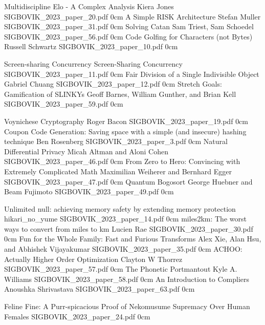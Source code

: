 \addpaper
	{Multidiscipline Elo - A Complex Analysis}
	{Kiera Jones}
	{}
	{SIGBOVIK_2023_paper_20.pdf}
	{0cm}
	{}
\addpaper
	{A Simple RISK Architecture}
	{Stefan Muller}
	{}
	{SIGBOVIK_2023_paper_31.pdf}
	{0cm}
	{}
\addpaper
	{Solving Catan}
	{Sam Triest, Sam Schoedel}
	{}
	{SIGBOVIK_2023_paper_56.pdf}
	{0cm}
	{}
\addpaper
	{Code Golfing for Characters (not Bytes)}
	{Russell Schwartz}
	{}
	{SIGBOVIK_2023_paper_10.pdf}
	{0cm}
	{}

\addpaper
	{Screen-sharing Concurrency}
	{Screen-Sharing Concurrency}
	{}
	{SIGBOVIK_2023_paper_11.pdf}
	{0cm}
	{}
\addpaper
	{Fair Division of a Single Indivisible Object}
	{Gabriel Chuang}
	{}
	{SIGBOVIK_2023_paper_12.pdf}
	{0cm}
	{}
\addpaper
	{Stretch Goals: Gamification of SLINKYs}
	{Geoff Barnes, William Gunther, and Brian Kell}
	{}
	{SIGBOVIK_2023_paper_59.pdf}
	{0cm}
	{}

\addpaper
	{Voynichese Cryptography}
	{Roger Bacon}
	{}
	{SIGBOVIK_2023_paper_19.pdf}
	{0cm}
	{}
\addpaper
	{Coupon Code Generation: Saving space with a simple (and insecure) hashing technique}
	{Ben Rosenberg}
	{}
	{SIGBOVIK_2023_paper_3.pdf}
	{0cm}
	{}
\addpaper
	{Natural Differential Privacy}
	{Micah Altman and Aloni Cohen}
	{}
	{SIGBOVIK_2023_paper_46.pdf}
	{0cm}
	{}
\addpaper
	{From Zero to Hero: Convincing with Extremely Complicated Math}
	{Maximilian Weiherer and Bernhard Egger}
	{}
	{SIGBOVIK_2023_paper_47.pdf}
	{0cm}
	{}
\addpaper
	{Quantum Bogosort}
	{George Huebner and Beam Fujimoto}
	{}
	{SIGBOVIK_2023_paper_49.pdf}
	{0cm}
	{}


\addpaper
	{Unlimited null: achieving memory safety by extending memory protection}
	{hikari\_no\_yume}
	{}
	{SIGBOVIK_2023_paper_14.pdf}
	{0cm}
	{}
\addpaper
	{miles2km: The worst ways to convert from miles to km}
	{Lucien Rae}
	{}
	{SIGBOVIK_2023_paper_30.pdf}
	{0cm}
	{}
\addpaper
	{Fun for the Whole Family: Fast and Furious Transforms}
	{Alex Xie, Alan Hsu, and Abhishek Vijayakumar}
	{}
	{SIGBOVIK_2023_paper_35.pdf}
	{0cm}
	{}
\addpaper
	{ACHOO: Actually Higher Order Optimization}
	{Clayton W Thorrez}
	{}
	{SIGBOVIK_2023_paper_57.pdf}
	{0cm}
	{}
\addpaper
	{The Phonetic Portmantout}
	{Kyle A. Williams}
	{}
	{SIGBOVIK_2023_paper_58.pdf}
	{0cm}
	{}
\addpaper
	{An Introduction to Compliers}
	{Anoushka Shrivastava}
	{}
	{SIGBOVIK_2023_paper_63.pdf}
	{0cm}
	{}

\addpaper
	{Feline Fine: A Purr-spicacious Proof of Nekomusume Supremacy Over Human Females}
	{}
	{}
	{SIGBOVIK_2023_paper_24.pdf}
	{0cm}
	{}


